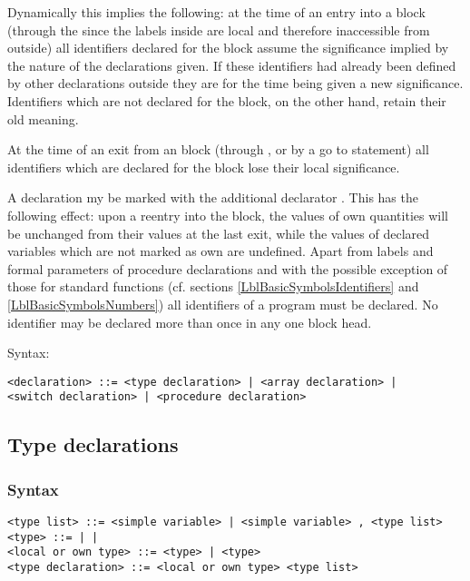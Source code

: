 \documentclass[a4paper,11pt]{article}
\begin{document}
Dynamically this implies the following: at the time of an entry into a
block (through the  since the labels inside are local and
therefore inaccessible from outside) all identifiers declared for the
block assume the significance implied by the nature of the
declarations given.  If these identifiers had already been defined by
other declarations outside they are for the time being given a new
significance.  Identifiers which are not declared for the block, on
the other hand, retain their old meaning.

At the time of an exit from an block (through , or by a go
to statement) all identifiers which are declared for the block lose
their local significance.

A declaration my be marked with the additional declarator .
This has the following effect: upon a reentry into the block, the
values of own quantities will be unchanged from their values at the
last exit, while the values of declared variables which are not marked
as own are undefined.  Apart from labels and formal parameters of
procedure declarations and with the possible exception of those for
standard functions (cf. sections \ref{LblBasicSymbolsIdentifiers} and
\ref{LblBasicSymbolsNumbers}) all identifiers of a program must be
declared.  No identifier may be declared more than once in any one
block head.

Syntax:

\begin{flushleft}
\vspace{0.2em}\texttt{<declaration> ::= <type declaration> | <array declaration> |\\
  \hspace{1.0cm}<switch declaration> | <procedure declaration>}\\
\end{flushleft}


\subsection{Type declarations}
\label{LblTypeDeclarations}

\subsubsection{Syntax}
\label{LblTypeDeclarationsSyntax}

\begin{flushleft}
\vspace{0.2em}\texttt{<type list> ::= <simple variable> | <simple variable> , <type list>}\\

\vspace{0.2em}\texttt{<type> ::=  |  | }\\

\vspace{0.2em}\texttt{<local or own type> ::= <type> |  <type>}\\

\vspace{0.2em}\texttt{<type declaration> ::= <local or own type> <type list>}\\
\end{flushleft}
\end{document}
